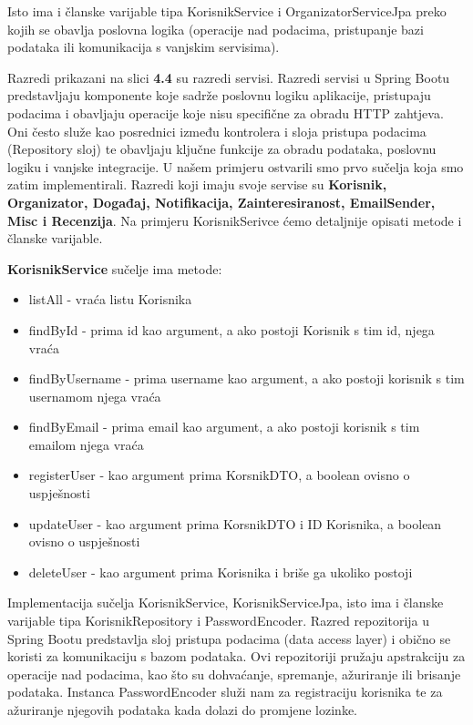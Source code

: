 			Isto ima i članske varijable tipa KorisnikService i OrganizatorServiceJpa  preko kojih se obavlja poslovna logika (operacije nad podacima, pristupanje bazi podataka ili komunikacija s vanjskim servisima).
			\newline

			Razredi prikazani na slici \textbf{4.4} su razredi servisi. Razredi servisi u Spring Bootu predstavljaju komponente koje sadrže poslovnu logiku aplikacije, pristupaju podacima i obavljaju operacije koje nisu specifične za obradu HTTP zahtjeva. Oni često služe kao posrednici između kontrolera i sloja pristupa podacima (Repository sloj) te obavljaju ključne funkcije za obradu podataka, poslovnu logiku i vanjske integracije. U našem primjeru ostvarili smo prvo sučelja koja smo zatim implementirali.
			Razredi koji imaju svoje servise su \textbf{Korisnik, Organizator, Događaj, Notifikacija, Zainteresiranost, EmailSender, Misc i Recenzija}. Na primjeru KorisnikSerivce ćemo detaljnije opisati metode i članske varijable.
			\newline
			
			\textbf{KorisnikService} sučelje ima metode: 
			\begin{itemize}
				\item listAll - vraća listu Korisnika
				\item findById - prima id kao argument, a ako postoji Korisnik s tim id, njega vraća
				\item findByUsername - prima username kao argument, a ako postoji korisnik s tim usernamom njega vraća
				\item findByEmail - prima email kao argument, a ako postoji korisnik s tim emailom njega vraća
				\item registerUser - kao argument prima KorsnikDTO, a boolean ovisno o uspješnosti
				\item updateUser - kao argument prima KorsnikDTO i ID Korisnika, a boolean ovisno o uspješnosti
				\item deleteUser - kao argument prima Korisnika i briše ga ukoliko postoji
			\end{itemize}
			
			Implementacija sučelja KorisnikService, KorisnikServiceJpa, isto ima i članske varijable tipa KorisnikRepository i PasswordEncoder. Razred repozitorija u Spring Bootu predstavlja sloj pristupa podacima (data access layer) i obično se koristi za komunikaciju s bazom podataka. Ovi repozitoriji pružaju apstrakciju za operacije nad podacima, kao što su dohvaćanje, spremanje, ažuriranje ili brisanje podataka. Instanca PasswordEncoder služi nam za registraciju korisnika te za ažuriranje njegovih podataka kada dolazi do promjene lozinke.
			\newline


